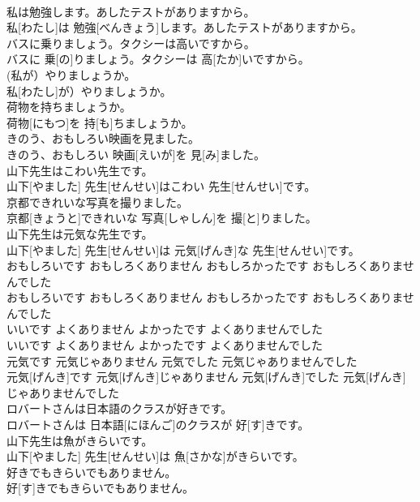 \documentclass[8pt]{extreport}
\begin{document}
\begin{CJK}{UTF8}{min}
\\	私は勉強します。あしたテストがありますから。	
\\	私[わたし]は 勉強[べんきょう]します。あしたテストがありますから。	
\\	バスに乗りましょう。タクシーは高いですから。	
\\	バスに 乗[の]りましょう。タクシーは 高[たか]いですから。	
\\	(私が）やりましょうか。	
\\	私[わたし]が）やりましょうか。	
\\	荷物を持ちましょうか。	
\\	荷物[にもつ]を 持[も]ちましょうか。	
\\	きのう、おもしろい映画を見ました。	
\\	きのう、おもしろい 映画[えいが]を 見[み]ました。	
\\	山下先生はこわい先生です。	
\\	山下[やました] 先生[せんせい]はこわい 先生[せんせい]です。	
\\	京都できれいな写真を撮りました。	
\\	京都[きょうと]できれいな 写真[しゃしん]を 撮[と]りました。	
\\	山下先生は元気な先生です。	
\\	山下[やました] 先生[せんせい]は 元気[げんき]な 先生[せんせい]です。	
\\	おもしろいです おもしろくありません おもしろかったです おもしろくありませんでした	
\\	おもしろいです おもしろくありません おもしろかったです おもしろくありませんでした	
\\	いいです よくありません よかったです よくありませんでした	
\\	いいです よくありません よかったです よくありませんでした	
\\	元気です 元気じゃありません 元気でした 元気じゃありませんでした	
\\	元気[げんき]です 元気[げんき]じゃありません 元気[げんき]でした 元気[げんき]じゃありませんでした	
\\	ロバートさんは日本語のクラスが好きです。	
\\	ロバートさんは 日本語[にほんご]のクラスが 好[す]きです。	
\\	山下先生は魚がきらいです。	
\\	山下[やました] 先生[せんせい]は 魚[さかな]がきらいです。	
\\	好きでもきらいでもありません。	
\\	好[す]きでもきらいでもありません。	

\end{CJK}
\end{document}
